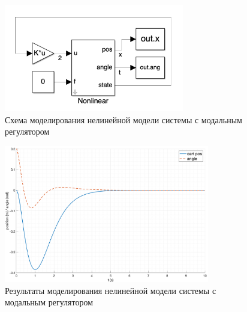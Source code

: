 \begin{figure}[ht!]
    \centering
    \includegraphics[width=0.7\textwidth]{media/modal_control_scheme.png}
    \caption{Схема моделирования нелинейной модели системы с модальным регулятором}
    \label{fig:modal_control_scheme_nonlinear}
\end{figure}
\begin{figure}[ht!]
    \centering
    \includegraphics[width=0.8\textwidth]{media/plots/modal_control/modal_control_out_0.png}
    \caption{Результаты моделирования нелинейной модели системы с модальным регулятором}
    \label{fig:modal_control_nonlinear_out}
\end{figure}

